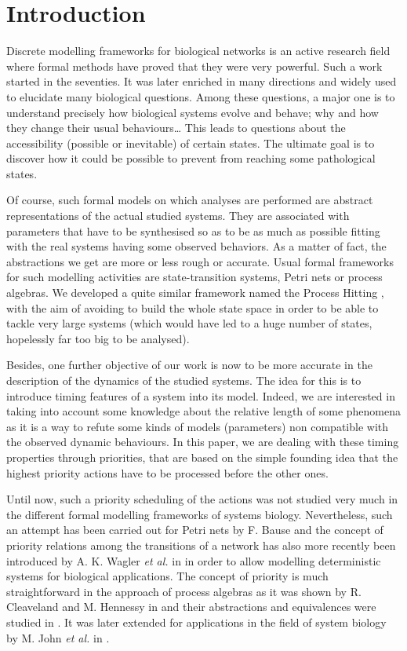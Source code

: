 \section{Introduction}
\label{sec:intro}

Discrete modelling frameworks for biological networks is an active research field where formal methods have proved that they were very powerful.
Such a work started in the seventies.
It was later enriched in many directions and widely used to elucidate many biological questions.
Among these questions, a major one is to understand precisely how biological systems evolve and behave; why and how they change their usual behaviours…
This leads to questions about the accessibility (possible or inevitable) of certain states.
The ultimate goal is to discover how it could be possible to prevent from reaching some pathological states.

Of course, such formal models on which analyses are performed are abstract representations of the actual studied systems.
They are associated with parameters that have to be synthesised so as to be as much as possible fitting with the real systems having some observed behaviors.
As a matter of fact, the abstractions we get are more or less rough or accurate.
Usual formal frameworks for such modelling activities are state-transition systems, Petri nets or process algebras.
We developed a quite similar framework named the Process Hitting \cite{PMR10-TCSB}, with the aim of avoiding to build the whole state space in order to be able to tackle very large systems
(which would have led to a huge number of states, hopelessly far too big to be analysed).

Besides, one further objective of our work is now to be more accurate in the description of the dynamics of the studied systems.
The idea for this is to introduce timing features of a system into its model.
Indeed, we are interested in taking into account some knowledge about the relative length of some phenomena as it is a way to refute some kinds of models (parameters) non compatible with the observed dynamic behaviours.
In this paper, we are dealing with these timing properties through priorities,
that are based on the simple founding idea that the highest priority actions have to be processed before the other ones.

Until now, such a priority scheduling of the actions was not studied very much in the different formal modelling frameworks of systems biology.
Nevertheless, such an attempt has been carried out for Petri nets by F. Bause \cite{Bause97}
and the concept of priority relations among the transitions of a network has also more recently been introduced by A. K. Wagler \textit{et al.} in \cite{waw,WaglerW12} in order to allow modelling deterministic systems for biological applications.
The concept of priority is much straightforward in the approach of process algebras as it was shown by R. Cleaveland and M. Hennessy in \cite{Cleaveland199058,Cleaveland99prioritiesin} and their abstractions and equivalences were studied in \cite{Cleaveland:2007:PAP:1282576.1282847}.
It was later extended for applications in the field of system biology by M. John \textit{et al.} in \cite{jlnu2010}.

